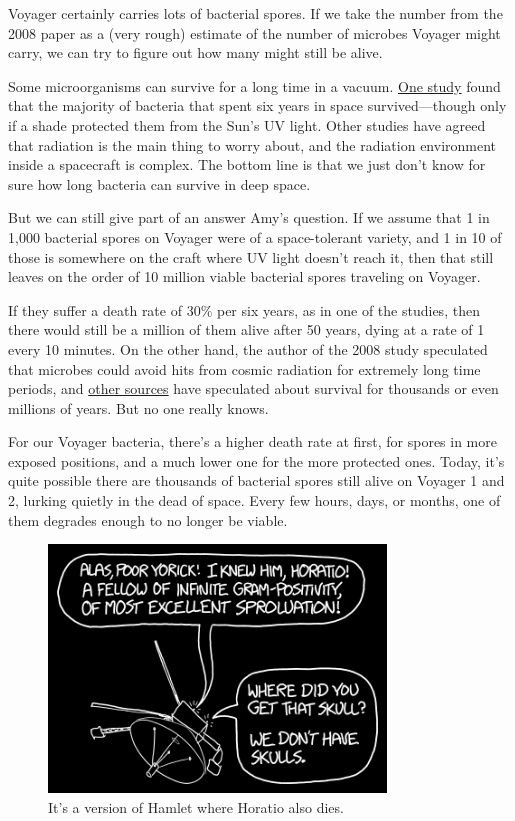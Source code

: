 {{Voyager certainly carries lots of bacterial spores. If we take the number from the 2008 paper as a (very rough) estimate of the number of microbes Voyager might carry, we can try to figure out how many might still be alive.}

{Some microorganisms can survive for a long time in a vacuum. \href{http://www.sciencedirect.com/science/article/pii/0273117794904480}{One study} found that the majority of bacteria that spent six years in space survived—though only if a shade protected them from the Sun's UV light. Other studies have agreed that radiation is the main thing to worry about, and the radiation environment inside a spacecraft is complex. The bottom line is that we just don't know for sure how long bacteria can survive in deep space.}

{But we can still give part of an answer Amy's question. If we assume that 1 in 1,000 bacterial spores on Voyager were of a space-tolerant variety, and 1 in 10 of those is somewhere on the craft where UV light doesn't reach it, then that still leaves on the order of 10 million viable bacterial spores traveling on Voyager.}

{If they suffer a death rate of 30\% per six years, as in one of the studies, then there would still be a million of them alive after 50 years, dying at a rate of 1 every 10 minutes. On the other hand, the author of the 2008 study speculated that microbes could avoid hits from cosmic radiation for extremely long time periods, and \href{http://www.ncbi.nlm.nih.gov/pmc/articles/PMC99004/\#B109}{other sources} have speculated about survival for thousands or even millions of years. But no one really knows.}

{For our Voyager bacteria, there's a higher death rate at first, for spores in more exposed positions, and a much lower one for the more protected ones. Today, it's quite possible there are thousands of bacterial spores still alive on Voyager 1 and 2, lurking quietly in the dead of space. Every few hours, days, or months, one of them degrades enough to no longer be viable.}

\begin{figure}[!htbp]
\centering
\includegraphics[scale=0.5, max width=0.8\textwidth]{imgs/a/117/alas.png}
\caption{It's a version of Hamlet where Horatio also dies.}
\end{figure}

}
